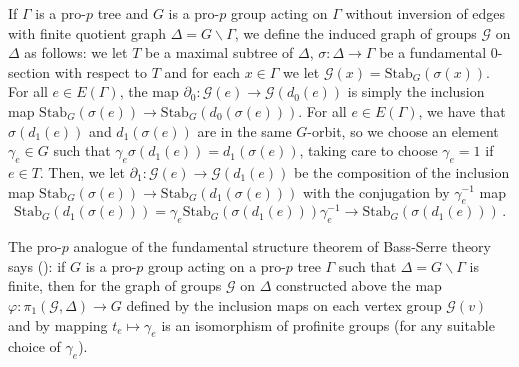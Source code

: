\documentclass[a4paper]{amsart}
\DeclareMathOperator{\bbf}{\mathbb{F}}
\theoremstyle{definition}
\begin{document}
If \(\Gamma\) is a pro-\(p\) tree and \(G\) is a pro-\(p\) group acting on \(\Gamma\) without inversion of edges with finite quotient graph \(\Delta = G\backslash \Gamma\), we define the induced graph of groups \(\mathcal{G}\) on \(\Delta\) as follows: we let \(T\) be a maximal subtree of \(\Delta\), \(\sigma\colon \Delta \to \Gamma\) be a fundamental \(0\)-section with respect to \(T\) and for each \(x \in \Gamma\) we let \(\mathcal{G}(x) = \mathrm{Stab}_G(\sigma(x))\). For all \(e \in E(\Gamma)\), the map \(\partial_0\colon \mathcal{G}(e) \to \mathcal{G}(d_0(e))\) is simply the inclusion map \(\mathrm{Stab}_G(\sigma(e)) \to \mathrm{Stab}_G(d_0(\sigma(e)))\). For all \(e \in E(\Gamma)\), we have that \(\sigma(d_1(e))\) and \(d_1(\sigma(e))\) are in the same \(G\)-orbit, so we choose an element \(\gamma_e \in G\) such that \(\gamma_e\sigma(d_1(e)) = d_1(\sigma(e))\), taking care to choose \(\gamma_e = 1\) if \(e \in T\). Then, we let \(\partial_1\colon \mathcal{G}(e) \to \mathcal{G}(d_1(e))\) be the composition of the inclusion map \(\mathrm{Stab}_G(\sigma(e)) \to \mathrm{Stab}_G(d_1(\sigma(e)))\) with the conjugation by \(\gamma_e^{-1}\) map \[\mathrm{Stab}_G(d_1(\sigma(e))) = \gamma_e\mathrm{Stab}_G(\sigma(d_1(e)))\gamma_e^{-1} \to \mathrm{Stab}_G(\sigma(d_1(e)))\,.\] 

The pro-\(p\) analogue of the fundamental structure theorem of Bass-Serre theory says (\cite[Thm. 6.6.1]{ribesProfiniteGraphsGroups2017}): if \(G\) is a pro-\(p\) group acting on a pro-\(p\) tree \(\Gamma\)  such that \(\Delta = G\backslash \Gamma\) is finite, then for the graph of groups \(\mathcal{G}\) on \(\Delta\) constructed above the map \(\varphi\colon \pi_1(\mathcal{G},\Delta) \to G\) defined by the inclusion maps on each vertex group \(\mathcal{G}(v)\) and by mapping \(t_e \mapsto \gamma_e\) is an isomorphism of profinite groups (for any suitable choice of \(\gamma_e\)).

\end{document}
